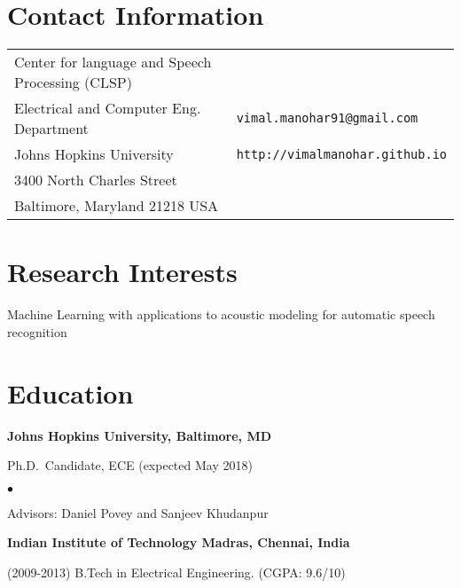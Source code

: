 \documentclass[margin,line,pifont,palatino,courier]{res}
\newenvironment{list1}{
  \begin{list}{\ding{113}}{%
      \setlength{\itemsep}{0in}
      \setlength{\parsep}{0in} \setlength{\parskip}{0in}
      \setlength{\topsep}{0in} \setlength{\partopsep}{0in}
      \setlength{\leftmargin}{0.17in}}}{\end{list}}
\newenvironment{list2}{
  \begin{list}{$\bullet$}{%
      \setlength{\itemsep}{0in}
      \setlength{\parsep}{0in} \setlength{\parskip}{0in}
      \setlength{\topsep}{0in} \setlength{\partopsep}{0in}
      \setlength{\leftmargin}{0.2in}}}{\end{list}}
\begin{document}

\begin{resume}

\section{\sc Contact Information}

\vspace{.05in}
\begin{tabular}{@{}p{2.75in}p{2in}}
Center for language and Speech Processing (CLSP) \\
Electrical and Computer Eng. Department                        & \verb+vimal.manohar91@gmail.com+\\
Johns Hopkins University                  & \verb+http://vimalmanohar.github.io+\\
3400 North Charles Street               & \\
Baltimore, Maryland 21218 USA               & \\
\end{tabular}

\section{\sc Research Interests}
Machine Learning with applications to acoustic modeling for automatic speech recognition

\section{\sc Education}

\textbf{Johns Hopkins University, Baltimore, MD} \\
\vspace*{-.1in}
\begin{list1}
\item[] Ph.D.~Candidate, ECE (expected May 2018)

\begin{list2}
\vspace*{.05in}
\item Advisors: Daniel Povey and Sanjeev Khudanpur
\end{list2}
\end{list1}

\textbf{Indian Institute of Technology Madras, Chennai, India} \\
\vspace*{-.1in}
\begin{list1}
\item[(2009-2013)] B.Tech in Electrical Engineering. (CGPA: 9.6/10)


\end{list1}
\end{resume}
\end{document}
